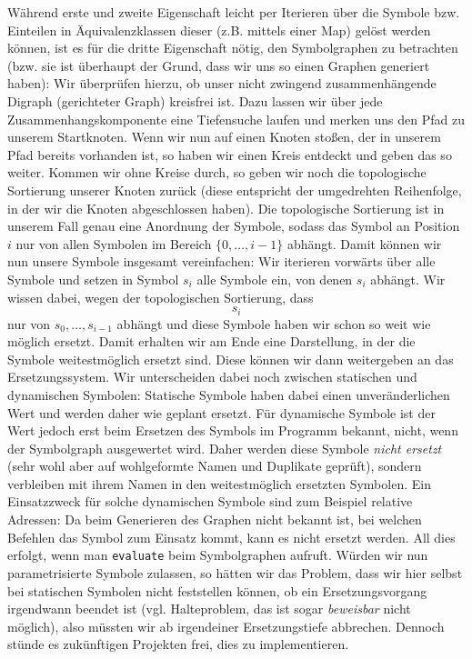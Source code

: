 Während erste und zweite Eigenschaft leicht per Iterieren über die Symbole bzw.
Einteilen in Äquivalenzklassen dieser (z.B. mittels einer Map) gelöst werden
können, ist es für die dritte Eigenschaft nötig, den Symbolgraphen zu betrachten
(bzw. sie ist überhaupt der Grund, dass wir uns so einen Graphen generiert
haben): Wir überprüfen hierzu, ob unser nicht zwingend zusammenhängende Digraph
(gerichteter Graph) kreisfrei ist. Dazu lassen wir über jede
Zusammenhangskomponente eine Tiefensuche laufen und merken uns den Pfad zu
unserem Startknoten. Wenn wir nun auf einen Knoten stoßen, der in unserem Pfad
bereits vorhanden ist, so haben wir einen Kreis entdeckt und geben das so weiter. Kommen wir ohne
Kreise durch, so geben wir noch die topologische Sortierung unserer Knoten
zurück (diese entspricht der umgedrehten Reihenfolge, in der wir die Knoten
abgeschlossen haben). Die topologische Sortierung ist in unserem Fall genau eine
Anordnung der Symbole, sodass das Symbol an Position $i$ nur von allen
Symbolen im Bereich $\{0,\dots,i-1\}$ abhängt. Damit können wir nun unsere
Symbole insgesamt vereinfachen: Wir iterieren vorwärts über alle Symbole und
setzen in Symbol $s_i$ alle Symbole ein, von denen $s_i$ abhängt. Wir wissen
dabei, wegen der topologischen Sortierung, dass $$s_i$$ nur von
$s_0,\dots,s_{i-1}$ abhängt und diese Symbole haben wir schon so weit wie möglich
ersetzt. Damit erhalten wir am Ende eine Darstellung, in der die Symbole
weitestmöglich ersetzt sind. Diese können wir dann weitergeben an das
Ersetzungssystem. Wir unterscheiden dabei noch zwischen statischen und
dynamischen Symbolen: Statische Symbole haben dabei einen unveränderlichen Wert
und werden daher wie geplant ersetzt. Für dynamische Symbole ist der Wert jedoch
erst beim Ersetzen des Symbols im Programm bekannt, nicht, wenn der
Symbolgraph ausgewertet wird. Daher werden diese Symbole \emph{nicht ersetzt}
(sehr wohl aber auf wohlgeformte Namen und Duplikate geprüft), sondern verbleiben
mit ihrem Namen in den weitestmöglich ersetzten Symbolen. Ein Einsatzzweck für
solche dynamischen Symbole sind zum Beispiel relative Adressen: Da beim
Generieren des Graphen nicht bekannt ist, bei welchen Befehlen das Symbol zum
Einsatz kommt, kann es nicht ersetzt werden. All dies erfolgt, wenn man
\texttt{evaluate} beim Symbolgraphen aufruft. Würden wir nun parametrisierte
Symbole zulassen, so hätten wir das Problem, dass wir hier selbst bei statischen
Symbolen nicht feststellen können, ob ein Ersetzungsvorgang irgendwann beendet
ist (vgl. Halteproblem, das ist sogar \emph{beweisbar} nicht möglich), also
müssten wir ab irgendeiner Ersetzungstiefe abbrechen. Dennoch stünde es
zukünftigen Projekten frei, dies zu implementieren.

